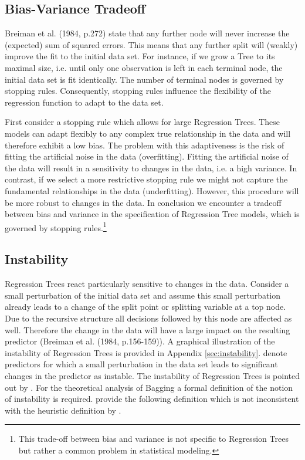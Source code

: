 \subsection{Bias-Variance Tradeoff} \label{sec:BiasVariance}
Breiman et al. (1984, p.272) state that any further node will never increase the (expected) sum of squared errors. This means that any further split will (weakly) improve the fit to the initial data set. For instance, if we grow a Tree to its maximal size, i.e. until only one observation is left in each terminal node, the initial data set is fit identically. The number of terminal nodes is governed by stopping rules. Consequently, stopping rules influence the flexibility of the regression function to adapt to the data set. 

First consider a stopping rule which allows for large Regression Trees. These models can adapt flexibly to any complex true relationship in the data and will therefore exhibit a low bias. The problem with this adaptiveness is the risk of fitting the artificial noise in the data (overfitting). Fitting the artificial noise of the data will result in a sensitivity to changes in the data, i.e. a high variance. In contrast, if we select a more restrictive stopping rule we might not capture the fundamental relationships in the data (underfitting). However, this procedure will be more robust to changes in the data. In conclusion we encounter a tradeoff between bias and variance in the specification of Regression Tree models, which is governed by stopping rules.\footnote{This trade-off between bias and variance is not specific to Regression Trees but rather a common problem in statistical modeling.}

\subsection{Instability}\label{sec:stability}
Regression Trees react particularly sensitive to changes in the data. Consider a small perturbation of the initial data set and assume this small perturbation already leads to a change of the split point or splitting variable at a top node. Due to the recursive structure all decisions followed by this node are affected as well. Therefore the change in the data will have a large impact on the resulting predictor (Breiman et al. (1984, p.156-159)). A graphical illustration of the instability of Regression Trees is provided in Appendix \ref{sec:instability}. \cite{Breiman1996} denote predictors for which a small perturbation in the data set leads to significant changes in the predictor as instable. The instability of Regression Trees is pointed out by \cite{breiman1996B}. For the theoretical analysis of Bagging a formal definition of the notion of instability is required. \cite{Buhlmann2002} provide the following definition which is not inconsistent with the heuristic definition by \cite{breiman1996B}.


